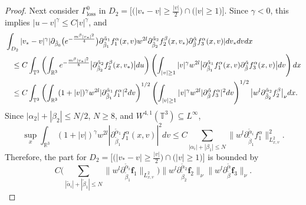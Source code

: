 \documentclass[reqno]{amsart}
\numberwithin{equation}{section}
\numberwithin{equation}{section}
\begin{document}
\begin{proof}
		 Next consider $\Gamma^0_{\text{loss}}$ in $D_2=\Big[\big(|v_*-v|\geq \frac{|v|}{2}\big)\cap \big(|v|\geq 1\big)\Big]$. Since $\gamma < 0$, this implies $|u - v|^\gamma \le C|v|^\gamma$, and
		 \begin{align*}
		 &\int_{D_2} |v_* - v|^\gamma | \partial_{\tilde{\beta}_0} \big( e^{-\frac{m^{\beta}|v_*|^2}{4}}\big)  \partial_{\tilde{\beta}_1}^{\tilde{\alpha}_1}f^{\alpha}_1 (x,v)w^{2l} \partial_{\tilde{\beta}_2}^{\tilde{\alpha}_2}f^{\beta}_2(x,v_*) \partial_{\tilde{\beta}}^{\tilde{\alpha}}f^{\alpha}_3 (x,v)| dv_* dv dx \\
		 &\hspace{0.3cm}\leq C \int_{\mathbb{T}^3} \left(\int_{\mathbb{R}^3} e^{-\frac{m^{\beta}|v_*|^2}{8}} \big| \partial_{\tilde{\beta}_2}^{\tilde{\alpha}_2}f^{\beta}_2(x,v_*) \big| du \right) \left( \int_{|v| \ge 1} |v|^\gamma w^{2l} \big|\partial_{\tilde{\beta}_1}^{\tilde{\alpha}_1}f^{\alpha}_1 (x,v)  \partial_{\tilde{\beta}}^{\tilde{\alpha}}f^{\alpha}_3 (x,v)\big| dv \right) dx\\
		 &\hspace{0.3cm}\leq C \int_{\mathbb{T}^3} \left( \int_{\mathbb{R}^3} (1 + |v|)^\gamma w^{2l} | \partial_{\tilde{\beta}_1}^{\tilde{\alpha}_1}f^{\alpha}_1 |^2 dv \right)^{1/2}
		  \left( \int_{|v| \ge 1} |v|^\gamma w^{2l} | \partial_{\tilde{\beta}}^{\tilde{\alpha}}f^{\alpha}_3 |^2 dv \right)^{1/2}\big| w^l \partial_{\tilde{\beta}_2}^{\tilde{\alpha}_2}f^{\beta}_2 \big|_{\nu} dx  .
		\end{align*}
		 Since $|\alpha_2| + |\beta_2| \le N/2$, $N \ge 8$, and $W^{4,1}(\mathbb{T}^3) \subseteq L^\infty$,
		 $$
		 \sup_x \int_{\mathbb{R}^3} (1 + |v|)^\gamma w^{2l} | \partial_{\tilde{\beta}_1}^{\tilde{\alpha}_1}f^{\alpha}_1(x, v) |^2 dv \le C \sum_{|\alpha_i| + |\beta_1| \le N} \big\| w^l \partial_{\tilde{\beta}_1}^{\tilde{\alpha}_i}f^{\alpha}_1 \big\|_{L^{2}_{x,v}}^2. 
		 $$
		 Therefore, the part for $D_2=\Big[\big(|v_*-v|\geq \frac{|v|}{2}\big)\cap \big(|v|\geq 1\big)\Big]$ is bounded by
		 $$
		  C \Bigg( \sum_{|\tilde{\alpha}_i| + |\tilde{\beta}_1| \le N} \big\| w^l \partial_{\tilde{\beta}_1}^{\tilde{\alpha}_i}\mathbf{f}_1 \big\|_{L^{2}_{x,v}} \Bigg) \big\| w^l \partial_{\tilde{\beta}_2}^{\tilde{\alpha}_2}\mathbf{f}_2 \big\|_{\nu} \big\| w^l \partial_{\tilde{\beta}}^{\tilde{\alpha}}\mathbf{f}_3 \big\|_{\nu}.
		 $$
		 

\end{proof}
\end{document}
